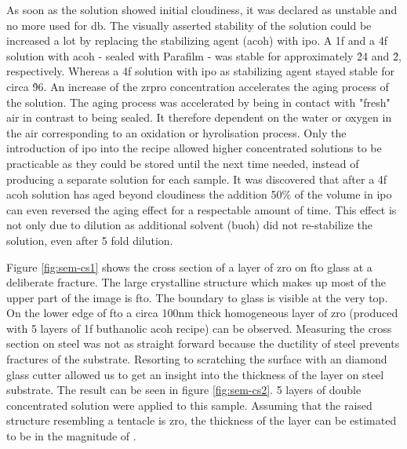As soon as the solution showed initial cloudiness, it was declared as unstable and no more used for \gls{db}. 
The visually asserted stability of the solution could be increased a lot by replacing the stabilizing agent (\gls{acoh}) with \gls{ipo}.
A \gls{1f} and a \gls{4f} solution with \gls{acoh} - sealed with Parafilm - was stable for approximately \h{24} and \h{2}, respectively.
Whereas a \gls{4f} solution with \gls{ipo} as stabilizing agent stayed stable for circa \h{96}. 
An increase of the \gls{zrpro} concentration accelerates the aging process of the solution.
The aging process was accelerated by being in contact with "fresh" air in contrast to being sealed. 
It therefore dependent on the water or oxygen in the air corresponding to an oxidation or hyrolisation process.
%
Only the introduction of \gls{ipo} into the recipe allowed higher concentrated solutions to be practicable 
as they could be stored until the next time needed, instead of producing a separate solution for each sample.
%
It was discovered that after a \gls{4f} \gls{acoh} solution has aged beyond cloudiness 
the addition 50\% of the volume in \gls{ipo} can even reversed the aging effect for a respectable amount of time. 
This effect is not only due to dilution as additional solvent (\gls{buoh}) did not re-stabilize the solution, 
even after 5 fold dilution. 

Figure \ref{fig:sem-cs1} shows the cross section of a layer of \gls{zro} on \gls{fto} glass at a deliberate fracture.
The large crystalline structure which makes up most of the upper part of the image is \gls{fto}. 
The boundary to glass is visible at the very top. 
On the lower edge of \gls{fto} a circa 100nm thick homogeneous layer of \gls{zro} (produced with 5 layers of \gls{1f} buthanolic \gls{acoh} recipe)  can be observed.
Measuring the cross section on steel was not as straight forward because the ductility of steel prevents fractures of the substrate. 
Resorting to scratching the surface with an diamond glass cutter allowed us to get an insight into the thickness of the layer on steel substrate.
%
The result can be seen in figure \ref{fig:sem-cs2}. 
5 layers of double concentrated solution were applied to this sample. 
Assuming that the raised structure resembling a tentacle is \gls{zro}, 
the thickness of the layer can be estimated to be in the magnitude of .

